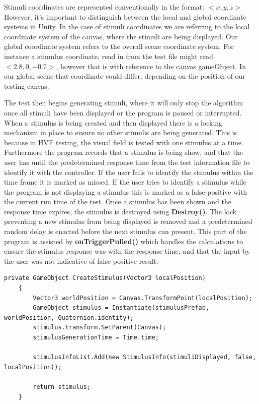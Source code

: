 \documentclass{l4proj}
\begin{document}
Stimuli coordinates are represented conventionally in the format:
$<x,y,z>$ \newline
However, it's important to distinguish between the local and global coordinate systems in Unity. In the case of stimuli coordinates we are referring to the local coordinate system of the canvas, where the stimuli are being displayed. Our global coordinate system refers to the overall scene coordinate system. For instance a stimulus coordinate, read in from the test file might read $<2.8,0,-0.7>$, however that is with reference to the canvas gameObject. In our global scene that coordinate could differ, depending on the position of our testing canvas.

The test then begins generating stimuli, where it will only stop the algorithm once all stimuli have been displayed or the program is paused or interrupted. When a stimulus is being created and then displayed there is a locking mechanism in place to ensure no other stimulis are being generated. This is because in HVF testing, the visual field is tested with one stimulus at a time. Furthermore the program records that a stimulus is being show, and that the user has until the predetermined response time from the test information file to identify it with the controller. If the user fails to identify the stimulus within the time frame it is marked as missed. If the user tries to identify a stimulus while the program is not displaying a stimulus this is marked as a false-positive with the current run time of the test. Once a stimulus has been shown and the response time expires, the stimulus is destroyed using \textbf{Destroy()}. The lock preventing a new stimulus from being displayed is removed and a predetermined random delay is enacted before the next stimulus can present. This part of the program is assisted by \textbf{onTriggerPulled()} which handles the calculations to ensure the stimulus response was with the response time, and that the input by the user was not indicative of false-positive result.
\begin{lstlisting}[language={[Sharp]C}, float=h!, caption={Exert from the testing script. Shows how a stimulus is displayed within the test scene and the information about the stimulus is stored.}]
    private GameObject CreateStimulus(Vector3 localPosition)
    {
        Vector3 worldPosition = Canvas.TransformPoint(localPosition);
        GameObject stimulus = Instantiate(stimulusPrefab, worldPosition, Quaternion.identity);
        stimulus.transform.SetParent(Canvas);
        stimulusGenerationTime = Time.time;

        stimulusInfoList.Add(new StimulusInfo(stimuliDisplayed, false, localPosition));

        return stimulus;
    }
\end{lstlisting} \label{createStimulus}
\end{document}
